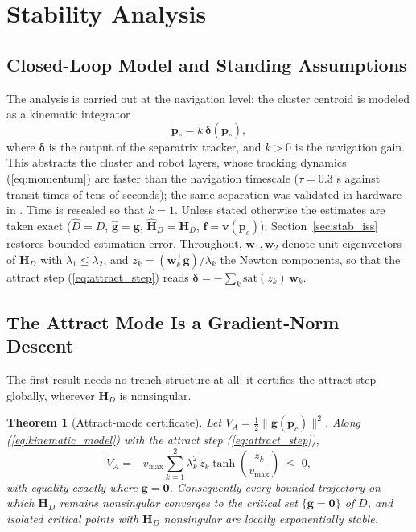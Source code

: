 \documentclass[lettersize,journal]{IEEEtran}
\newtheorem{theorem}{Theorem}
\begin{document}
\section{Stability Analysis}
\label{sec:stability}

\subsection{Closed-Loop Model and Standing Assumptions}

The analysis is carried out at the navigation level: the cluster
centroid is modeled as a kinematic integrator
\begin{equation}
    \dot{\mathbf{p}}_c = k\,\boldsymbol{\delta}(\mathbf{p}_c),
    \label{eq:kinematic_model}
\end{equation}
where $\boldsymbol{\delta}$ is the output of the separatrix tracker,
and $k > 0$ is the navigation gain. This abstracts the cluster and
robot layers, whose
tracking dynamics (\ref{eq:momentum}) are faster than the navigation
timescale ($\tau = 0.3$ s against transit times of tens of seconds);
the same separation was validated in hardware in \cite{14}. Time is rescaled
so that $k = 1$. Unless stated otherwise the estimates are taken exact
($\hat{D} = D$, $\hat{\mathbf{g}} = \mathbf{g}$, $\hat{\mathbf{H}}_D =
\mathbf{H}_D$, $\mathbf{f} = \mathbf{v}(\mathbf{p}_c)$);
Section~\ref{sec:stab_iss} restores bounded estimation error.
Throughout, $\mathbf{w}_1, \mathbf{w}_2$ denote unit eigenvectors of
$\mathbf{H}_D$ with $\lambda_1 \leq \lambda_2$, and $z_k =
(\mathbf{w}_k^\top \mathbf{g})/\lambda_k$ the Newton components, so
that the attract step (\ref{eq:attract_step}) reads
$\boldsymbol{\delta} = -\sum_k \mathrm{sat}(z_k)\,\mathbf{w}_k$.

\subsection{The Attract Mode Is a Gradient-Norm Descent}

The first result needs no trench structure at all: it certifies the attract step
globally, wherever $\mathbf{H}_D$ is nonsingular.

\begin{theorem}[Attract-mode certificate]
\label{thm:attract}
Let $V_A = \tfrac{1}{2}\|\mathbf{g}(\mathbf{p}_c)\|^2$. Along
(\ref{eq:kinematic_model}) with the attract step
(\ref{eq:attract_step}),
\begin{equation}
    \dot{V}_A = -v_{\max} \sum_{k=1}^{2} \lambda_k^2\,
    z_k \tanh\!\left(\frac{z_k}{v_{\max}}\right) \;\leq\; 0,
    \label{eq:VA_dot}
\end{equation}
with equality exactly where $\mathbf{g} = \mathbf{0}$. Consequently
every bounded trajectory on which $\mathbf{H}_D$ remains nonsingular
converges to the critical set $\{\mathbf{g} = \mathbf{0}\}$ of $D$, and
isolated critical points with $\mathbf{H}_D$ nonsingular are locally
exponentially stable.
\end{theorem}
\end{document}
